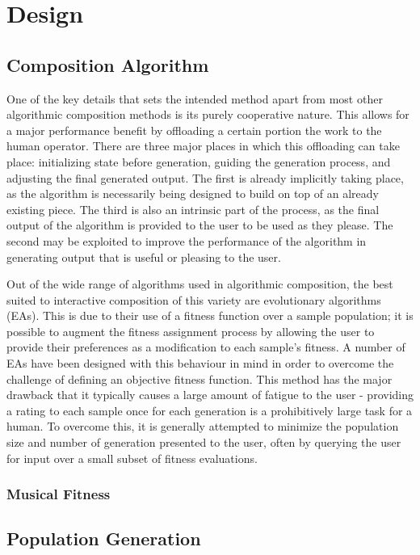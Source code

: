 \documentclass[ author={Stephen Livermore-Tozer},
				supervisor={Dr. Peter Flach},
				degree={MEng},
				title={Performing Algorithmic Co-composition Using Machine Learning},
				subtitle={},
				type={research},
				year={2016} ]{dissertation}
\begin{document}
	\section{Design}
	
	\subsection{Composition Algorithm}
	
	One of the key details that sets the intended method apart from most other algorithmic composition methods is its purely cooperative nature. This allows for a major performance benefit by offloading a certain portion the work to the human operator. There are three major places in which this offloading can take place: initializing state before generation, guiding the generation process, and adjusting the final generated output. The first is already implicitly taking place, as the algorithm is necessarily being designed to build on top of an already existing piece. The third is also an intrinsic part of the process, as the final output of the algorithm is provided to the user to be used as they please. The second may be exploited to improve the performance of the algorithm in generating output that is useful or pleasing to the user.
	
	Out of the wide range of algorithms used in algorithmic composition, the best suited to interactive composition of this variety are evolutionary algorithms (EAs). This is due to their use of a fitness function over a sample population; it is possible to augment the fitness assignment process by allowing the user to provide their preferences as a modification to each sample's fitness. A number of EAs have been designed with this behaviour in mind in order to overcome the challenge of defining an objective fitness function. This method has the major drawback that it typically causes a large amount of fatigue to the user - providing a rating to each sample once for each generation is a prohibitively large task for a human. To overcome this, it is generally attempted to minimize the population size and number of generation presented to the user, often by querying the user for input over a small subset of fitness evaluations. 
	
	\subsubsection{Musical Fitness}
	\label{sec:fitness}
	
	\subsection{Population Generation}
	
\end{document}
